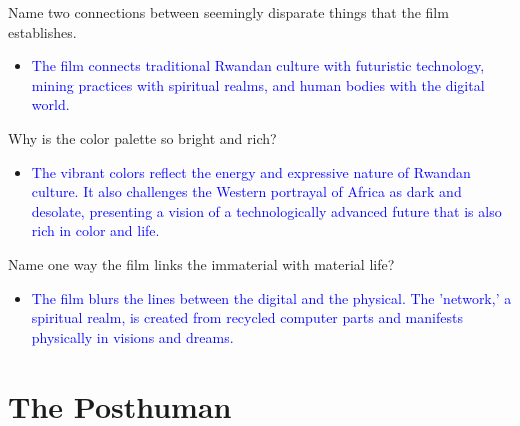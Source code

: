 \documentclass[11pt,fleqn]{book} %
\begin{document}
\begin{exercise}
Name two connections between seemingly disparate things that the film establishes.
\begin{itemize}
\item \textcolor{blue}{The film connects traditional Rwandan culture with futuristic technology, mining practices with  spiritual realms,  and human bodies with the digital world.}
\end{itemize}
\end{exercise}

\begin{exercise}
Why is the color palette so bright and rich?
\begin{itemize}
    \item \textcolor{blue}{The vibrant colors reflect the energy and expressive nature of Rwandan culture. It also challenges the Western portrayal of Africa as dark and desolate, presenting a vision of a technologically advanced future that is also rich in color and life.}
\end{itemize}
\end{exercise}

\begin{exercise}
Name one way the film links the immaterial with material life?
\begin{itemize}
    \item \textcolor{blue}{The film blurs the lines between the digital and the physical. The 'network,' a spiritual realm,  is created from recycled computer parts and manifests physically in visions and dreams.}
\end{itemize}
\end{exercise}











\section{The Posthuman}
\end{document}
